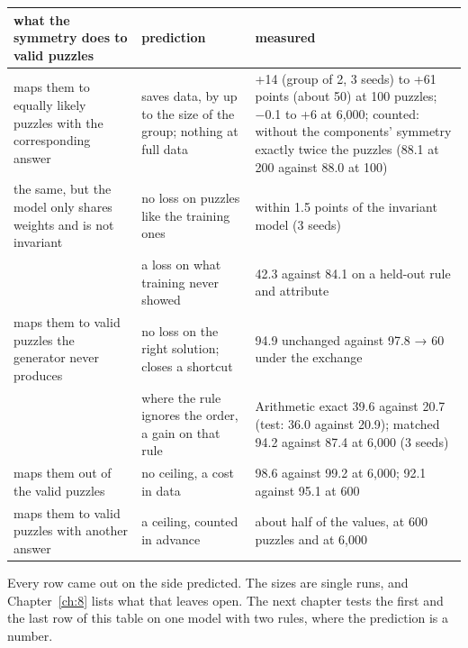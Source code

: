 \begin{center}\small
\begin{tabularx}{\linewidth}{@{}YYY@{}}
\toprule
what the symmetry does to valid puzzles & prediction & measured \\
\midrule
maps them to equally likely puzzles with the corresponding answer & saves data, by up to the size of the group; nothing at full data & +14 (group of 2, 3 seeds) to +61 points (about 50) at 100 puzzles; −0.1 to +6 at 6,000; counted: without the components' symmetry exactly twice the puzzles (88.1 at 200 against 88.0 at 100) \\
the same, but the model only shares weights and is not invariant & no loss on puzzles like the training ones & within 1.5 points of the invariant model (3 seeds) \\
 & a loss on what training never showed & 42.3 against 84.1 on a held-out rule and attribute \\
maps them to valid puzzles the generator never produces & no loss on the right solution; closes a shortcut & 94.9 unchanged against 97.8 → 60 under the exchange \\
 & where the rule ignores the order, a gain on that rule & Arithmetic exact 39.6 against 20.7 (test: 36.0 against 20.9); matched 94.2 against 87.4 at 6,000 (3 seeds) \\
maps them out of the valid puzzles & no ceiling, a cost in data & 98.6 against 99.2 at 6,000; 92.1 against 95.1 at 600 \\
maps them to valid puzzles with another answer & a ceiling, counted in advance & about half of the values, at 600 puzzles and at 6,000 \\
\bottomrule
\end{tabularx}
\end{center}

Every row came out on the side predicted. The sizes are single runs, and Chapter~\ref{ch:8} lists what that leaves open. The next chapter tests the first and the last row of this table on one model with two rules, where the prediction is a number.
